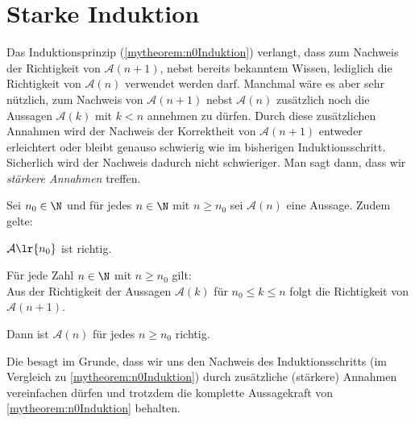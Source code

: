 \clearpage

\section{Starke Induktion}
Das Induktionsprinzip (\cref{mytheorem:n0Induktion}) verlangt, dass zum Nachweis der Richtigkeit von $\mathcal{A}(n+1)$, nebst bereits bekanntem Wissen, lediglich die Richtigkeit von $\mathcal{A}(n)$ verwendet werden darf. Manchmal wäre es aber sehr nützlich, zum Nachweis von $\mathcal{A}(n+1)$ nebst $\mathcal{A}(n)$ zusätzlich noch die Aussagen $\mathcal{A}(k)$ mit $k<n$ annehmen zu dürfen. Durch diese zusätzlichen Annahmen wird der Nachweis der Korrektheit von $\mathcal{A}(n+1)$ entweder erleichtert oder bleibt genauso schwierig wie im bisherigen Induktionsschritt. Sicherlich wird der Nachweis dadurch nicht schwieriger. Man sagt dann, dass wir \textit{stärkere Annahmen} treffen.

\begin{mytheorem}\label{mytheorem:starkeInduktion}
	Sei $n_0\in\N$ und für jedes $n\in\N$ mit $n\geq n_0$ sei $\mathcal{A}(n)$ eine Aussage. Zudem gelte:
	\begin{renum}
		\item $\mathcal{A}\lr{n_0}$ ist richtig.
		\item Für jede Zahl $n\in\N$ mit $n\geq n_0$ gilt:\\
		Aus der Richtigkeit der Aussagen $\mathcal{A}(k)$ für $n_0\leq k\leq n$ folgt die Richtigkeit von $\mathcal{A}(n+1)$.
	\end{renum}
	Dann ist $\mathcal{A}(n)$ für jedes $n\geq n_0$ richtig.
\end{mytheorem}
\begin{myremark}
	Die  besagt im Grunde, dass wir uns den Nachweis des Induktionsschritts (im Vergleich zu \cref{mytheorem:n0Induktion}) durch zusätzliche (stärkere) Annahmen vereinfachen dürfen und trotzdem die komplette Aussagekraft von \cref{mytheorem:n0Induktion} behalten.
\end{myremark}

